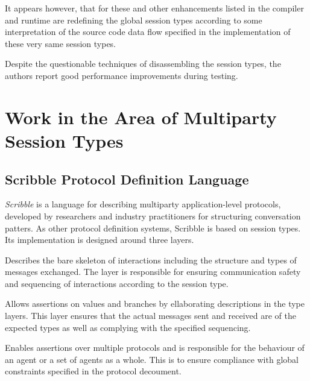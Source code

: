It appears however, that for these and other enhancements listed in \cite{sess_type_guided_distr_interact} the compiler and runtime are redefining the global session types according to some interpretation of the source code data flow specified in the implementation of these very same session types.

Despite the questionable techniques of disassembling the session types, the authors report good performance improvements during testing.   



\section{Work in the Area of Multiparty Session Types}
\label{sec:mpstarea}

\subsection*{Scribble Protocol Definition Language}

\textit{Scribble} \cite{scribble} is a language for describing multiparty application-level protocols, developed by researchers and industry practitioners for structuring conversation patters. As other protocol definition systems, Scribble is based on session types. Its implementation is designed around three layers.

\begin{packed_description}
\item [Type Layer] Describes the bare skeleton of interactions including the structure and types of messages exchanged. The layer is responsible for ensuring communication safety and sequencing of interactions according to the session type.

\item [Assertion Layer] Allows assertions on values and branches by ellaborating descriptions in the type layers. This layer ensures that the actual messages sent and received are of the expected types as well as complying with the specified sequencing. 

\item [Protocol Document Layer] Enables assertions over multiple protocols and is responsible for the behaviour of an agent or a set of agents as a whole. This is to ensure compliance with global constraints specified in the protocol decoument. 
\end{packed_description}

